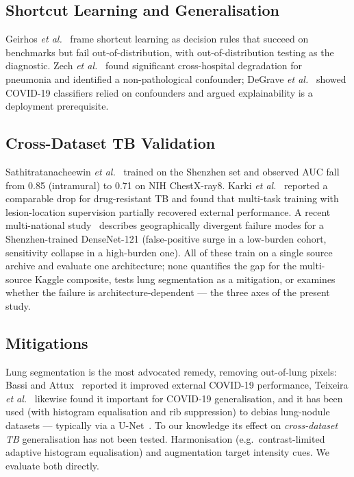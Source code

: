 \documentclass[journal]{IEEEtran}
\begin{document}
\subsection{Shortcut Learning and Generalisation}
Geirhos \emph{et al.}~\cite{geirhos2020shortcut} frame shortcut learning as
decision rules that succeed on benchmarks but fail out-of-distribution, with
out-of-distribution testing as the diagnostic. Zech
\emph{et al.}~\cite{zech2018variable} found significant cross-hospital
degradation for pneumonia and identified a non-pathological confounder; DeGrave
\emph{et al.}~\cite{degrave2021ai} showed COVID-19 classifiers relied on
confounders and argued explainability is a deployment prerequisite.

\subsection{Cross-Dataset TB Validation}
Sathitratanacheewin \emph{et al.}~\cite{sathitratanacheewin2020deep} trained on
the Shenzhen set and observed AUC fall from 0.85 (intramural) to 0.71 on NIH
ChestX-ray8. Karki \emph{et al.}~\cite{karki2022generalization} reported a
comparable drop for drug-resistant TB and found that multi-task training with
lesion-location supervision partially recovered external performance. A recent
multi-national study~\cite{shuaibu2026geographic} describes geographically
divergent failure modes for a Shenzhen-trained DenseNet-121 (false-positive
surge in a low-burden cohort, sensitivity collapse in a high-burden one). All
of these train on a single source archive and evaluate one architecture; none
quantifies the gap for the multi-source Kaggle composite, tests lung
segmentation as a mitigation, or examines whether the failure is
architecture-dependent --- the three axes of the present study.

\subsection{Mitigations}
Lung segmentation is the most advocated remedy, removing out-of-lung pixels:
Bassi and Attux~\cite{bassi2022covid} reported it improved external COVID-19
performance, Teixeira \emph{et al.}~\cite{teixeira2021impact} likewise found it
important for COVID-19 generalisation, and it has been used (with histogram
equalisation and rib suppression) to debias lung-nodule datasets --- typically
via a U-Net~\cite{ronneberger2015unet}. To our knowledge its effect on
\emph{cross-dataset TB} generalisation has not been tested. Harmonisation
(e.g.\ contrast-limited adaptive histogram equalisation) and augmentation
target intensity cues. We evaluate both directly.
\end{document}
